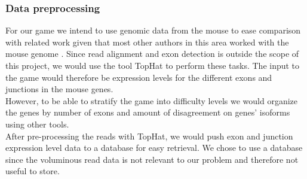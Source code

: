 \documentclass[12pt]{article}
\begin{document}
\subsubsection*{Data preprocessing}
For our game we intend to use genomic data from the mouse to ease comparison with related work given that most other authors in this area worked with the mouse genome \citep{trapnell2010transcript,guttman2010ab,feng2010inference,li2011isolasso}. Since read alignment and exon detection is outside the scope of this project, we would use the tool TopHat \citep{trapnell2009tophat} to perform these tasks. The input to the game would therefore be expression levels for the different exons and junctions in the mouse genes. \\
However, to be able to stratify the game into difficulty levels we would organize the genes by number of exons and amount of disagreement on genes' isoforms using other tools. \\
After pre-processing the reads with TopHat, we would push exon and junction expression level data to a database for easy retrieval. We chose to use a database since the voluminous read data is not relevant to our problem and therefore not useful to store.
\end{document}
